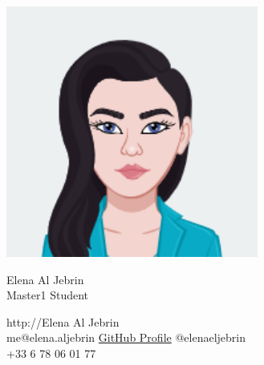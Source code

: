 \documentclass{article}
\begin{document}
\centering \includegraphics[width=.25\linewidth]{logo}\\[2pt]
\parbox{2in}{\Large \centering Elena Al Jebrin\\[1pt]
\normalsize Master1 Student}

\vfill
\raggedright
\begin{multicols}{2}
http://Elena Al Jebrin\\
me@elena.aljebrin
\href{https://elena-aljebrin.github.io/}{GitHub Profile}
\columnbreak
\raggedleft
@elenaeljebrin\\
+33 6 78 06 01 77%
\end{multicols}%
\end{document}
